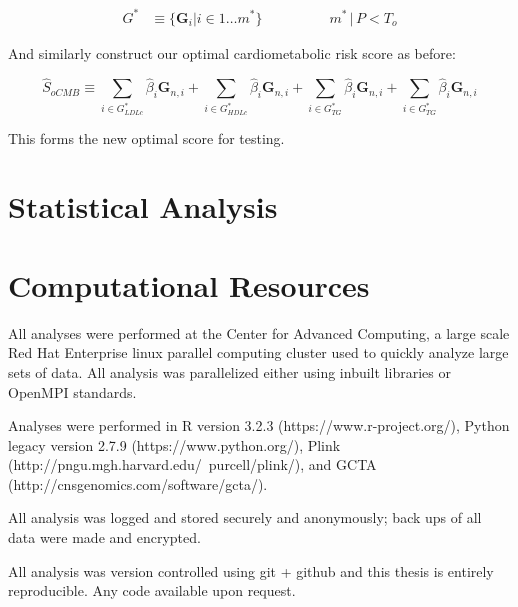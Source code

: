 $$ \begin{aligned} G^* &\equiv \{ \mathbf{G}_i | i \in 1 \dots m^* \} &&&&&& m^* \, |  \, P < T_{o} \end{aligned}$$

And similarly construct our optimal cardiometabolic risk score as before:


$$ \hat{S}_{oCMB} \equiv \sum_{i \in G^*_{LDLc}} \hat{\beta}_i \mathbf{G}_{n, i} + \sum_{i \in G^*_{HDLc}} \hat{\beta}_i \mathbf{G}_{n, i} + \sum_{i \in G^*_{TG}} \hat{\beta}_i \mathbf{G}_{n, i} + \sum_{i \in G^*_{TG}} \hat{\beta}_i \mathbf{G}_{n, i} $$

This forms the new optimal score for testing.

\section{Statistical Analysis}


\section{Computational Resources}

All analyses were performed at the Center for Advanced Computing, a large scale Red Hat Enterprise linux parallel computing cluster used to quickly analyze large sets of data. All analysis was parallelized either using inbuilt libraries or OpenMPI standards. 

Analyses were performed in R version 3.2.3 (https://www.r-project.org/), Python legacy version 2.7.9 (https://www.python.org/), Plink (http://pngu.mgh.harvard.edu/~purcell/plink/), and GCTA (http://cnsgenomics.com/software/gcta/).

All analysis was logged and stored securely and anonymously; back ups of all data were made and encrypted.

All analysis was version controlled using git + github and this thesis is entirely reproducible. Any code available upon request. 

\let\cleardoublepage\clearpage